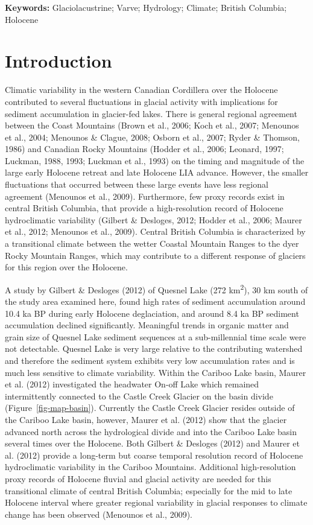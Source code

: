 \documentclass[
  letterpaper,
  DIV=11,
  numbers=noendperiod]{scrartcl}
\begin{document}
\textbf{Keywords:} Glaciolacustrine; Varve; Hydrology; Climate; British
Columbia; Holocene

\pagebreak

\hypertarget{introduction}{%
\section{Introduction}\label{introduction}}

Climatic variability in the western Canadian Cordillera over the
Holocene contributed to several fluctuations in glacial activity with
implications for sediment accumulation in glacier-fed lakes. There is
general regional agreement between the Coast Mountains (Brown et al.,
2006; Koch et al., 2007; Menounos et al., 2004; Menounos \& Clague,
2008; Osborn et al., 2007; Ryder \& Thomson, 1986) and Canadian Rocky
Mountains (Hodder et al., 2006; Leonard, 1997; Luckman, 1988, 1993;
Luckman et al., 1993) on the timing and magnitude of the large early
Holocene retreat and late Holocene LIA advance. However, the smaller
fluctuations that occurred between these large events have less regional
agreement (Menounos et al., 2009). Furthermore, few proxy records exist
in central British Columbia, that provide a high-resolution record of
Holocene hydroclimatic variability (Gilbert \& Desloges, 2012; Hodder et
al., 2006; Maurer et al., 2012; Menounos et al., 2009). Central British
Columbia is characterized by a transitional climate between the wetter
Coastal Mountain Ranges to the dyer Rocky Mountain Ranges, which may
contribute to a different response of glaciers for this region over the
Holocene.

A study by Gilbert \& Desloges (2012) of Quesnel Lake (272
km\textsuperscript{2}), 30 km south of the study area examined here,
found high rates of sediment accumulation around 10.4 ka BP during early
Holocene deglaciation, and around 8.4 ka BP sediment accumulation
declined significantly. Meaningful trends in organic matter and grain
size of Quesnel Lake sediment sequences at a sub-millennial time scale
were not detectable. Quesnel Lake is very large relative to the
contributing watershed and therefore the sediment system exhibits very
low accumulation rates and is much less sensitive to climate
variability. Within the Cariboo Lake basin, Maurer et al. (2012)
investigated the headwater On-off Lake which remained intermittently
connected to the Castle Creek Glacier on the basin divide
(Figure~\ref{fig-map-basin}). Currently the Castle Creek Glacier resides
outside of the Cariboo Lake basin, however, Maurer et al. (2012) show
that the glacier advanced north across the hydrological divide and into
the Cariboo Lake basin several times over the Holocene. Both Gilbert \&
Desloges (2012) and Maurer et al. (2012) provide a long-term but coarse
temporal resolution record of Holocene hydroclimatic variability in the
Cariboo Mountains. Additional high-resolution proxy records of Holocene
fluvial and glacial activity are needed for this transitional climate of
central British Columbia; especially for the mid to late Holocene
interval where greater regional variability in glacial responses to
climate change has been observed (Menounos et al., 2009).
\end{document}
